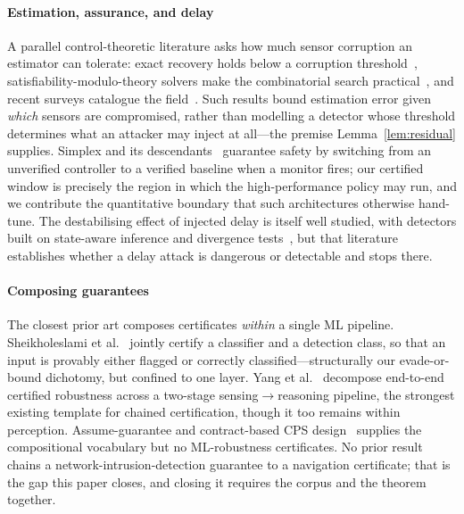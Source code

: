 \paragraph{Estimation, assurance, and delay}
A parallel control-theoretic literature asks how much sensor corruption an
estimator can tolerate: exact recovery holds below a corruption
threshold~\cite{fawzi2014secure}, satisfiability-modulo-theory solvers make the
combinatorial search practical~\cite{shoukry2017smt}, and recent surveys
catalogue the field~\cite{ding2021survey}. Such results bound estimation error
given \emph{which} sensors are compromised, rather than modelling a detector
whose threshold determines what an attacker may inject at all---the premise
Lemma~\ref{lem:residual} supplies. Simplex and its
descendants~\cite{sha2001simplex,mehmood2022blackbox,cofer2020rta} guarantee
safety by switching from an unverified controller to a verified baseline when a
monitor fires; our certified window is precisely the region in which the
high-performance policy may run, and we contribute the quantitative boundary
that such architectures otherwise hand-tune. The destabilising effect of
injected delay is itself well studied, with detectors built on state-aware
inference and divergence tests~\cite{lou2019timedelay,etd2023uav,datamut2026},
but that literature establishes whether a delay attack is dangerous or
detectable and stops there.

\paragraph{Composing guarantees}
The closest prior art composes certificates \emph{within} a single ML pipeline.
Sheikholeslami et al.~\cite{sheikholeslami2021provably} jointly certify a
classifier and a detection class, so that an input is provably either flagged or
correctly classified---structurally our evade-or-bound dichotomy, but confined
to one layer. Yang et al.~\cite{yang2022sensing} decompose end-to-end certified
robustness across a two-stage sensing$\to$reasoning pipeline, the strongest
existing template for chained certification, though it too remains within
perception. Assume-guarantee and contract-based CPS design~\cite{pacti2024}
supplies the compositional vocabulary but no ML-robustness certificates. No
prior result chains a network-intrusion-detection guarantee to a navigation
certificate; that is the gap this paper closes, and closing it requires the
corpus and the theorem together.

